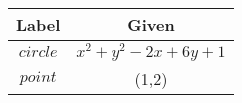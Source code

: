 \begin{tabular}[12pt]{ |c| c|}
    \hline
    \textbf{Label} & \textbf{Given}\\ 
    \hline
    $circle$ & $x^2+y^2-2x+6y+1$ \\
    \hline 
    $point$ & (1,2)\\
    \hline   
    \end{tabular}

